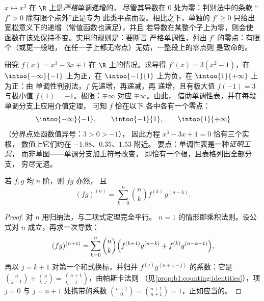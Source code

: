 \begin{example}[免费的严格性]\label{ex:b1:derivative:strictness}
$x \mapsto x^3$ 在 $\R$ 上是\emph{严格}单调递增的，
尽管其导数在 $0$ 处为零：判别法中的条款
“$f' > 0$ 除有限个点外”正是专为
此类平点而设。相比之下，单独的 $f' \geq 0$ 只给出
宽松意义下的递增（常值函数也满足），并且
若导数在某整个子上为零，则会使
函数在该处保持不变。实用的规则是：要断言
严格单调性，列出 $f'$ 的零点：有限个（或更一般地，
在任一子上都无零点）无妨，一整段上的零点则
是致命的。
\end{example}

\begin{example}[完整的单调性分析]\label{ex:b1:derivative:variations}
研究 $f(x) = x^3 - 3x + 1$ 在 $\R$ 上的情况。求导得 $f'(x) =
3(x^2 - 1)$，在 $\intoo{-\infty}{-1}$ 上为正，在
$\intoo{-1}{1}$ 上为负，在 $\intoo{1}{+\infty}$ 上为正：由
单调性判别法，$f$ 先递增，再递减，再
递增，且有极大值 $f(-1) = 3$ 与极小值
$f(1) = -1$。极限：$\mp\infty$ 对应 $\mp\infty$。由此，
借助单调性表，并在每段单调分支上应用介值定理，
可知 $f$ 恰在以下
各中各有一个零点：
\[
\intoo{-\infty}{-1}, \qquad \intoo{-1}{1}, \qquad
\intoo{1}{+\infty}
\]
（分界点处函数值异号：$3 > 0 > -1$），
因此方程 $x^3 - 3x + 1 = 0$ 恰有三个实根，
数值上它们约在 $-1.88$、$0.35$、$1.53$ 附近。
要点：单调性表是一种\emph{证明工具}，
而非草图——单调分支加上符号改变，
即恰有一个根，且表格列出全部分支，
穷尽无遗。
\end{example}

\begin{theorem}[莱布尼茨公式]\label{thm:b1:derivative:leibniz}
若 $f, g$ 均 $n$ 阶，则 $fg$ 亦然，
且
\[
(fg)^{(n)} = \sum_{k=0}^{n} \binom nk f^{(k)}\, g^{(n-k)} .
\]
\end{theorem}

\begin{proof}
对 $n$ 用归纳法，与二项式定理完全平行。
$n = 1$ 的情形即乘积法则。设公式对
$n$ 成立，再求一次导数：
\[
(fg)^{(n+1)} = \sum_{k=0}^{n} \binom nk
\Bigl( f^{(k+1)} g^{(n-k)} + f^{(k)} g^{(n-k+1)} \Bigr),
\]
再以 $j = k + 1$ 对第一个和式换标，并归并
$f^{(j)} g^{(n+1-j)}$ 的系数：它是 $\binom{n}{j-1} +
\binom nj = \binom{n+1}{j}$，由帕斯卡法则
（见\cref{prop:b1:counting:identities}），项 $j = 0$
与 $j = n + 1$ 处携带的系数 $\binom{n+1}{0} = \binom{n+1}{n+1} =
1$，正如应当的。
\end{proof}

